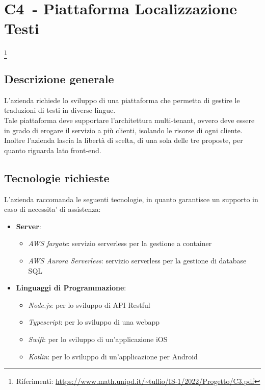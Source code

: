 
\renewcommand{\capName}{Piattaforma Localizzazione Testi} %
\renewcommand{\capCode}{C4} %
\renewcommand{\capLink}{https://www.math.unipd.it/~tullio/IS-1/2022/Progetto/C3.pdf} %
\renewcommand{\capProposer}{zero12} %


\section{\capCode\ - \capName} \footnote{Riferimenti: \url{\capLink}}
\subsection{Descrizione generale}
L'azienda richiede lo sviluppo di una piattaforma che permetta di gestire le traduzioni di testi in diverse lingue. \\
Tale piattaforma deve supportare l'architettura multi-tenant, ovvero deve essere in grado di erogare il servizio a più clienti, isolando le risorse di ogni cliente. \\
Inoltre l'azienda lascia la libertà di scelta, di una sola delle tre proposte, per quanto riguarda lato front-end. \\


\subsection{Tecnologie richieste}
L'azienda raccomanda le seguenti tecnologie, in quanto garantisce un supporto in caso di necessita' di assistenza:
\begin{itemize}
    \item \textbf{Server}: 
        \begin{itemize}
            \item \emph{AWS fargate}: servizio serverless per la gestione a container
            \item \emph{AWS Aurora Serverless}: servizio serverless per la gestione di database SQL
        \end{itemize}
    \item \textbf{Linguaggi di Programmazione}: 
        \begin{itemize}
            \item \emph{Node.js}: per lo sviluppo di API Restful
            \item \emph{Typescript}: per lo sviluppo di una webapp
            \item \emph{Swift}: per lo sviluppo di un'applicazione iOS
            \item \emph{Kotlin}: per lo sviluppo di un'applicazione per Android
        \end{itemize}
\end{itemize}

